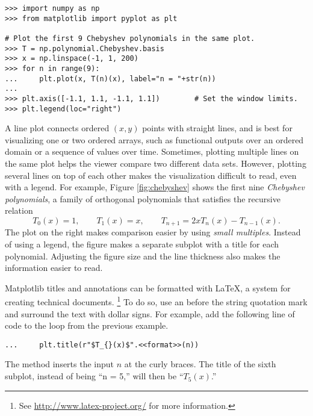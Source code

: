 \begin{lstlisting}
>>> import numpy as np
>>> from matplotlib import pyplot as plt

# Plot the first 9 Chebyshev polynomials in the same plot.
>>> T = np.polynomial.Chebyshev.basis
>>> x = np.linspace(-1, 1, 200)
>>> for n in range(9):
...     plt.plot(x, T(n)(x), label="n = "+str(n))
...
>>> plt.axis([-1.1, 1.1, -1.1, 1.1])        # Set the window limits.
>>> plt.legend(loc="right")
\end{lstlisting}

A line plot connects ordered $(x,y)$ points with straight lines, and is best for visualizing one or two ordered arrays, such as functional outputs over an ordered domain or a sequence of values over time.
Sometimes, plotting multiple lines on the same plot helps the viewer compare two different data sets.
However, plotting several lines on top of each other makes the visualization difficult to read, even with a legend.
For example, Figure \ref{fig:chebyshev} shows the first nine \emph{Chebyshev polynomials}, a family of orthogonal polynomials that satisfies the recursive relation
\[
T_0(x) = 1, \qquad T_1(x) = x, \qquad T_{n+1} = 2xT_n(x) - T_{n-1}(x).
\]
The plot on the right makes comparison easier by using \emph{small multiples}. %
Instead of using a legend, the figure makes a separate subplot with a title for each polynomial.
Adjusting the figure size and the line thickness also makes the information easier to read.


\begin{info} %
Matplotlib titles and annotations can be formatted with \LaTeX, a system for creating technical documents.%
\footnote{See \url{http://www.latex-project.org/} for more information.}
To do so, use an  before the string quotation mark and surround the text with dollar signs.
For example, add the following line of code to the loop from the previous example.

\begin{lstlisting}
...     plt.title(r"$T_{}(x)$".<<format>>(n))
\end{lstlisting}

The  method inserts the input $n$ at the curly braces.
The title of the sixth subplot, instead of being ``n = 5,'' will then be ``$T_5(x)$.''
\end{info}

